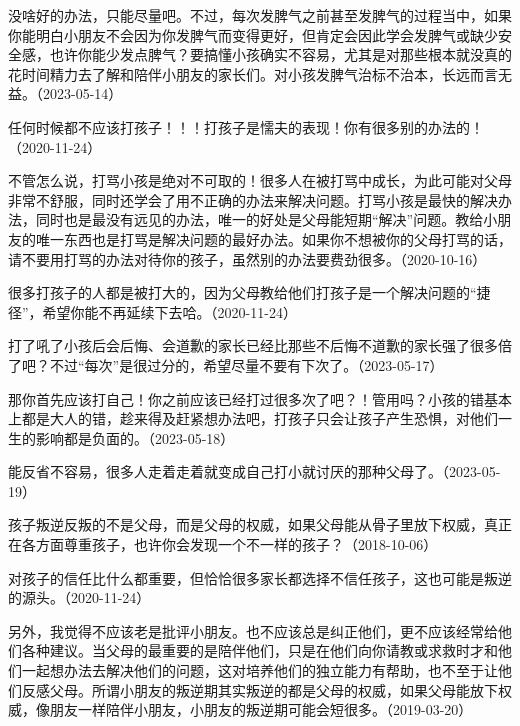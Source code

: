 
没啥好的办法，只能尽量吧。不过，每次发脾气之前甚至发脾气的过程当中，如果你能明白小朋友不会因为你发脾气而变得更好，但肯定会因此学会发脾气或缺少安全感，也许你能少发点脾气？要搞懂小孩确实不容易，尤其是对那些根本就没真的花时间精力去了解和陪伴小朋友的家长们。对小孩发脾气治标不治本，长远而言无益。（2023-05-14）

任何时候都不应该打孩子！！！打孩子是懦夫的表现！你有很多别的办法的！（2020-11-24）

不管怎么说，打骂小孩是绝对不可取的！很多人在被打骂中成长，为此可能对父母非常不舒服，同时还学会了用不正确的办法来解决问题。打骂小孩是最快的解决办法，同时也是最没有远见的办法，唯一的好处是父母能短期“解决”问题。教给小朋友的唯一东西也是打骂是解决问题的最好办法。如果你不想被你的父母打骂的话，请不要用打骂的办法对待你的孩子，虽然别的办法要费劲很多。（2020-10-16）

很多打孩子的人都是被打大的，因为父母教给他们打孩子是一个解决问题的“捷径”，希望你能不再延续下去哈。（2020-11-24）


打了吼了小孩后会后悔、会道歉的家长已经比那些不后悔不道歉的家长强了很多倍了吧？不过“每次”是很过分的，希望尽量不要有下次了。（2023-05-17）


那你首先应该打自己！你之前应该已经打过很多次了吧？！管用吗？小孩的错基本上都是大人的错，趁来得及赶紧想办法吧，打孩子只会让孩子产生恐惧，对他们一生的影响都是负面的。（2023-05-18）

能反省不容易，很多人走着走着就变成自己打小就讨厌的那种父母了。（2023-05-19）


孩子叛逆反叛的不是父母，而是父母的权威，如果父母能从骨子里放下权威，真正在各方面尊重孩子，也许你会发现一个不一样的孩子？（2018-10-06）

对孩子的信任比什么都重要，但恰恰很多家长都选择不信任孩子，这也可能是叛逆的源头。（2020-11-24）

另外，我觉得不应该老是批评小朋友。也不应该总是纠正他们，更不应该经常给他们各种建议。当父母的最重要的是陪伴他们，只是在他们向你请教或求救时才和他们一起想办法去解决他们的问题，这对培养他们的独立能力有帮助，也不至于让他们反感父母。所谓小朋友的叛逆期其实叛逆的都是父母的权威，如果父母能放下权威，像朋友一样陪伴小朋友，小朋友的叛逆期可能会短很多。（2019-03-20）

